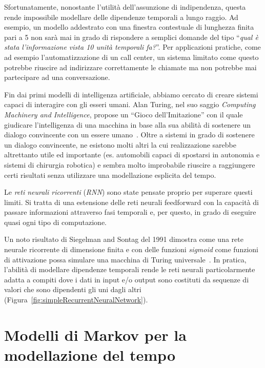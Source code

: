 Sfortunatamente, nonostante l'utilit\`a dell'assunzione di indipendenza, questa
rende impossibile modellare delle dipendenze temporali a lungo raggio. Ad esempio,
un modello addestrato con una finestra contestuale di lunghezza finita pari a 5
non sar\`a mai in grado di rispondere a semplici domande del tipo ``\emph{qual
\`e stata l'informazione vista 10 unit\`a temporali fa?}''. Per applicazioni
pratiche, come ad esempio l'automatizzazione di un call center, un sistema
limitato come questo potrebbe riuscire ad indirizzare correttamente le chiamate
ma non potrebbe mai partecipare ad una conversazione.

Fin dai primi modelli di intelligenza artificiale, abbiamo cercato di creare
sistemi capaci di interagire con gli esseri umani. Alan Turing, nel suo saggio
\emph{Computing Machinery and Intelligence}, propose un ``Gioco dell'Imitazione''
con il quale giudicare l'intelligenza di una macchina in base alla sua abilit\`a
di sostenere un dialogo convincente con un essere umano~\cite{Turing:1950}.
Oltre a sistemi in grado di sostenere un dialogo convincente, ne esistono molti
altri la cui realizzazione sarebbe altrettanto utile ed importante (es. automobili
capaci di spostarsi in autonomia e sistemi di chirurgia robotica) e sembra molto
improbabile riuscire a raggiungere certi risultati senza utilizzare una modellazione
esplicita del tempo.

Le \emph{reti neurali ricorrenti} (\emph{RNN}) sono state pensate proprio per
superare questi limiti. Si tratta di una estensione delle reti neurali feedforward
con la capacit\`a di passare informazioni attraverso fasi temporali e, per questo,
in grado di eseguire quasi ogni tipo di computazione.

Un noto risultato di Siegelman and Sontag del 1991 dimostra come una rete neurale
ricorrente di dimensione finita e con delle funzioni \textit{sigmoid} come funzioni
di attivazione possa simulare una macchina di Turing universale~\cite{Siegelmann:1991}.
In pratica, l'abilit\`a di modellare dipendenze temporali rende le reti neurali
particolarmente adatta a compiti dove i dati in input e/o output sono costituti
da sequenze di valori che sono dipendenti gli uni dagli altri (Figura~\ref{fig:simpleRecurrentNeuralNetwork}).

\section{Modelli di Markov per la modellazione del tempo}

